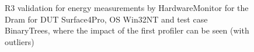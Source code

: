 \begin{figure}
                            \caption{R3 validation for energy measurements by HardwareMonitor for the Dram for DUT Surface4Pro, OS Win32NT and test case BinaryTrees, where the impact of the first profiler can be seen (with outliers)} \label{fig:Surface4Pro_HardwareMonitor_Dram_R3_energy_with_outliers_Win32NT_avg_watts}
                            \end{figure}
                            